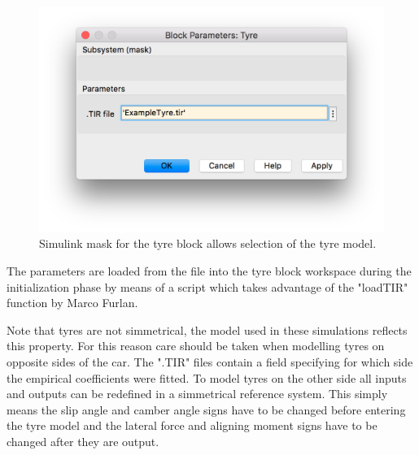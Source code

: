 \begin{figure}[ht]
  \centering
  \includegraphics[scale=0.5]{images/tyremask.png}
  \caption{Simulink mask for the tyre block allows selection of the tyre model.}
  \label{tyremask}
\end{figure}

The parameters are loaded from the file into the tyre block workspace during the initialization phase by means of a script which takes advantage of the "loadTIR" function by Marco Furlan\cite{loadtir}.

Note that tyres are not simmetrical, the model used in these simulations reflects this property. For this reason care should be taken when modelling tyres on opposite sides of the car. The ".TIR" files contain a field specifying for which side the empirical coefficients were fitted. To model tyres on the other side all inputs and outputs can be redefined in a simmetrical reference system. This simply means the slip angle and camber angle signs have to be changed before entering the tyre model and the lateral force and aligning moment signs have to be changed after they are output.

